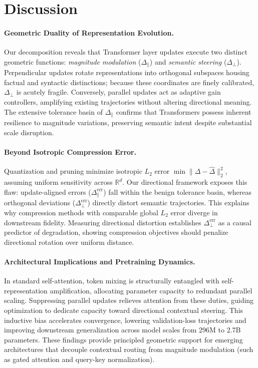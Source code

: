 \section{Discussion}
\label{sec:discussion}

\paragraph{Geometric Duality of Representation Evolution.}
Our decomposition reveals that Transformer layer updates execute two distinct geometric functions: \textit{magnitude modulation} ($\Delta_\parallel$) and \textit{semantic steering} ($\Delta_\perp$). Perpendicular updates rotate representations into orthogonal subspaces housing factual and syntactic distinctions; because these coordinates are finely calibrated, $\Delta_\perp$ is acutely fragile. Conversely, parallel updates act as adaptive gain controllers, amplifying existing trajectories without altering directional meaning. The extensive tolerance basin of $\Delta_\parallel$ confirms that Transformers possess inherent resilience to magnitude variations, preserving semantic intent despite substantial scale disruption.

\paragraph{Beyond Isotropic Compression Error.}
Quantization and pruning minimize isotropic $L_2$ error $\min \|\Delta - \widehat{\Delta}\|_2^2$, assuming uniform sensitivity across $\mathbb{R}^d$. Our directional framework exposes this flaw: update-aligned errors ($\Delta_\parallel^{\mathrm{err}}$) fall within the benign tolerance basin, whereas orthogonal deviations ($\Delta_\perp^{\mathrm{err}}$) directly distort semantic trajectories. This explains why compression methods with comparable global $L_2$ error diverge in downstream fidelity. Measuring directional distortion establishes $\Delta_\perp^{\mathrm{err}}$ as a causal predictor of degradation, showing compression objectives should penalize directional rotation over uniform distance.

\paragraph{Architectural Implications and Pretraining Dynamics.}
In standard self-attention, token mixing is structurally entangled with self-representation amplification, allocating parameter capacity to redundant parallel scaling. Suppressing parallel updates relieves attention from these duties, guiding optimization to dedicate capacity toward directional contextual steering. This inductive bias accelerates convergence, lowering validation-loss trajectories and improving downstream generalization across model scales from 296M to 2.7B parameters. These findings provide principled geometric support for emerging architectures that decouple contextual routing from magnitude modulation (such as gated attention and query-key normalization).
